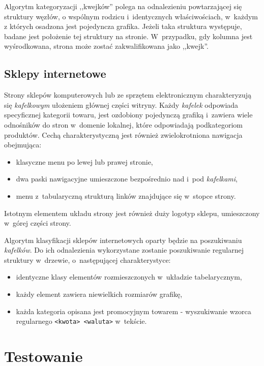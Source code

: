 \documentclass[a4paper,10pt]{article}
\begin{document}
Algorytm kategoryzacji ,,kwejków'' polega na odnalezieniu powtarzającej się struktury węzłów, o wspólnym rodzicu i~identycznych właściwościach, w~każdym z których osadzona jest pojedyncza grafika. Jeżeli taka struktura występuje, badane jest położenie tej struktury na stronie. W~przypadku, gdy kolumna jest wyśrodkowana, strona może zostać zakwalifikowana jako ,,kwejk''.

\subsection*{Sklepy internetowe}

Strony sklepów komputerowych lub ze sprzętem elektronicznym charakteryzują się \emph{kafelkowym} ułożeniem głównej części witryny. Każdy \emph{kafelek} odpowiada specyficznej kategorii towaru, jest ozdobiony pojedynczą grafiką i~zawiera wiele odnośników do stron w~domenie lokalnej, które odpowiadają podkategoriom produktów. Cechą charakterystyczną jest również zwielokrotniona nawigacja obejmująca:

\begin{itemize}
 \item klasyczne menu po lewej lub prawej stronie,
 \item dwa paski nawigacyjne umieszczone bezpośrednio nad i~pod \emph{kafelkami},
 \item menu z~tabularyczną strukturą linków znajdujące się w~stopce strony.
\end{itemize}

\noindent Istotnym elementem układu strony jest również duży logotyp sklepu, umieszczony w~górej części strony. 

Algorytm klasyfikacji sklepów internetowych oparty będzie na poszukiwaniu \emph{kafelków}. Do ich odnalezienia wykorzystane zostanie poszukiwanie regularnej struktury w~drzewie, o~następującej charakterystyce:

\begin{itemize}
 \item identyczne klasy elementów rozmieszczonych w~układzie tabelarycznym,
 \item każdy element zawiera niewielkich rozmiarów grafikę,
 \item każda kategoria opisana jest promocyjnym towarem - wyszukiwanie wzorca regularnego \verb+<kwota> <waluta>+ w~tekście.
\end{itemize}

\section*{Testowanie}
\end{document}
